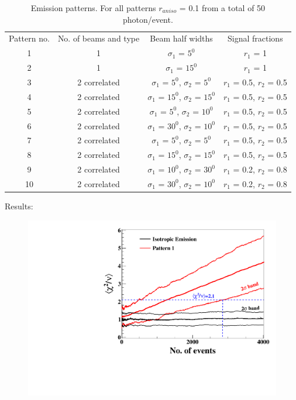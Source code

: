 \begin{table}[h]
  \centering
  \caption{Emission patterns. For all patterns $r_{aniso}$ = 0.1 from a 
  total of 50 photon/event.}
  \label{tab:AnisoPattern}
  \begin{tabular}{|c | c| c | c|}
  \hline
  Pattern no. & No. of beams and type & Beam half widths & Signal fractions \\
  1 & 1 & $\sigma_1$ = $5^{0}$ & $r_1$ = 1 \\
   2 & 1 & $\sigma_1$ = $15^{0}$ & $r_1$ = 1 \\
   3 & 2 correlated & $\sigma_1$ = $5^{0}$, $\sigma_2$ = $5^{0}$ & $r_1$ = 0.5, $r_2$ = 0.5  \\
   4 & 2 correlated & $\sigma_1$ = $15^{0}$, $\sigma_2$ = $15^{0}$ & $r_1$ = 0.5, $r_2$ = 0.5 \\
   5 & 2 correlated & $\sigma_1$ = $5^{0}$, $\sigma_2$ = $10^{0}$ & $r_1$ = 0.5, $r_2$ = 0.5 \\
   6 & 2 correlated & $\sigma_1$ = $30^{0}$, $\sigma_2$ = $10^{0}$ & $r_1$ = 0.5, $r_2$ = 0.5 \\
   7 & 2 correlated & $\sigma_1$ = $5^{0}$, $\sigma_2$ = $5^{0}$ & $r_1$ = 0.5, $r_2$ = 0.5 \\
   8 & 2 correlated & $\sigma_1$ = $15^{0}$, $\sigma_2$ = $15^{0}$ & $r_1$ = 0.5, $r_2$ = 0.5 \\
   9 & 2 correlated & $\sigma_1$ = $10^{0}$, $\sigma_2$ = $30^{0}$ & $r_1$ = 0.2, $r_2$ = 0.8 \\
    10 & 2 correlated & $\sigma_1$ = $30^{0}$, $\sigma_2$ = $10^{0}$ & $r_1$ = 0.2, $r_2$ = 0.8 \\
  \hline
 \end{tabular}
\end{table}

Results:

\begin{figure}[h]
\centerline{\includegraphics[width=0.5\linewidth]{Pattern1.pdf}}
\caption{}
\label{fig:pattern1}
\end{figure}
